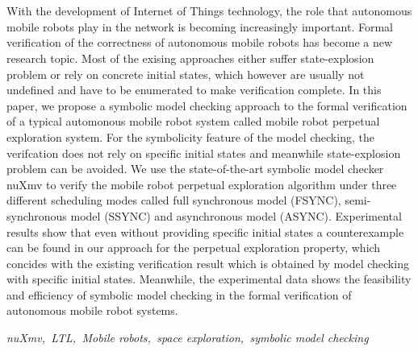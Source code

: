 \newpage
\vspace{-1cm}
\chapter*{}
\vspace{-0.5cm}
With the development of Internet of Things technology, the role that autonomous mobile robots play in the network is becoming increasingly important. Formal verification of the correctness of autonomous mobile robots has become a new research topic. Most of the exising approaches either suffer state-explosion problem or rely on concrete initial states, which however are usually not undefined and have to be enumerated to make verification complete. In this paper, we propose a symbolic model checking approach to the formal verification of a typical automonous mobile robot system called mobile robot perpetual exploration system. For the symbolicity feature of the model checking, the verifcation does not rely on specific initial states and meanwhile state-explosion problem can be avoided. We use the state-of-the-art symbolic model checker nuXmv to verify the mobile robot perpetual exploration algorithm under three different scheduling modes called full synchronous model (FSYNC), semi-synchronous model (SSYNC) and asynchronous model (ASYNC). Experimental results show that even without providing specific initial states a counterexample can be found in our approach for the perpetual exploration property, which concides with the existing verification result which is obtained by model checking with specific initial states. Meanwhile, the experimental data shows the feasibility and efficiency of symbolic model checking in the formal verification of autonomous mobile robot systems.

\hspace{-0.5cm}

{} \textit{nuXmv,\, LTL,\, Mobile robots,\, space exploration,\, symbolic model checking
}
































